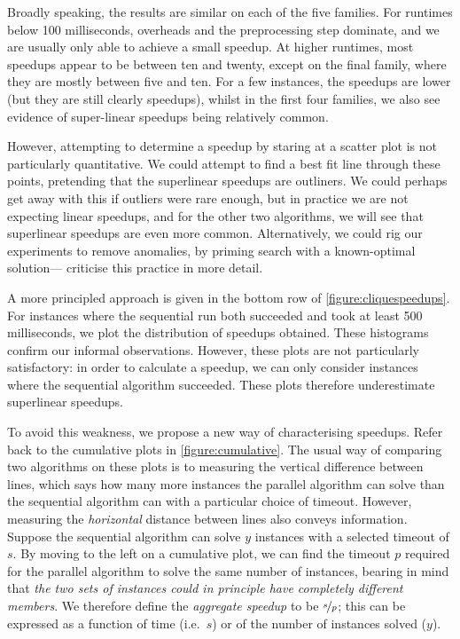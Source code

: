 \documentclass[sigconf]{acmart}
\begin{document}
Broadly speaking, the results are similar on each of the five families. For runtimes below 100
milliseconds, overheads and the preprocessing step dominate, and we are usually only able to achieve
a small speedup. At higher runtimes, most speedups appear to be between ten and twenty, except on
the final family, where they are mostly between five and ten. For a few instances, the speedups are
lower (but they are still clearly speedups), whilst in the first four families, we also see evidence
of super-linear speedups being relatively common.

However, attempting to determine a speedup by staring at a scatter plot is not particularly
quantitative. We could attempt to find a best fit line through these points, pretending that the
superlinear speedups are outliners. We could perhaps get away with this if outliers were rare
enough, but in practice we are not expecting linear speedups, and for the other two algorithms, we
will see that superlinear speedups are even more common. Alternatively, we could rig our experiments
to remove anomalies, by priming search with a known-optimal
solution---\citet{DBLP:journals/topc/McCreeshP15} criticise this practice in more detail.

A more principled approach is given in the bottom row of \cref{figure:cliquespeedups}. For instances
where the sequential run both succeeded and took at least 500 milliseconds, we plot the distribution
of speedups obtained. These histograms confirm our informal observations. However, these plots are
not particularly satisfactory: in order to calculate a speedup, we can only consider instances where
the sequential algorithm succeeded. These plots therefore underestimate superlinear speedups.

To avoid this weakness, we propose a new way of characterising speedups. Refer back to the
cumulative plots in \cref{figure:cumulative}. The usual way of comparing two algorithms on these
plots is to measuring the vertical difference between lines, which says how many more instances the
parallel algorithm can solve than the sequential algorithm can with a particular choice of timeout.
However, measuring the \emph{horizontal} distance between lines also conveys information. Suppose
the sequential algorithm can solve $y$ instances with a selected timeout of $s$. By moving to the
left on a cumulative plot, we can find the timeout $p$ required for the parallel algorithm to solve
the same number of instances, bearing in mind that \emph{the two sets of instances could in
principle have completely different members}. We therefore define the \emph{aggregate speedup} to be
$\nicefrac{s}{p}$; this can be expressed as a function of time (i.e.\ $s$) or of the number of
instances solved ($y$).
\end{document}
